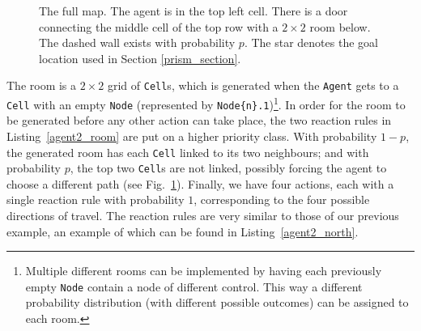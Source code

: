 \documentclass[runningheads]{llncs}
\begin{document}
\begin{figure}
  \centering
  \caption{The full map. The agent is in the top left cell. There is a door
    connecting the middle cell of the top row with a $2 \times 2$ room below.
    The dashed wall exists with probability $p$. The star denotes the goal
    location used in Section \ref{prism_section}.}
  \label{agent2_map}
\end{figure}





The room is a $2 \times 2$ grid of \texttt{Cell}s, which is generated when the
\texttt{Agent} gets to a \texttt{Cell} with an empty \texttt{Node} (represented
by \texttt{Node\{n\}.1})\footnote{Multiple different rooms can be implemented by
having each previously empty \texttt{Node} contain a node of different control.
This way a different probability distribution (with different possible outcomes)
can be assigned to each room.}. In order for the room to be generated before any
other action can take place, the two reaction rules in Listing~\ref{agent2_room}
are put on a higher priority class. With probability $1-p$, the generated room
has each \texttt{Cell} linked to its two neighbours; and with probability $p$,
the top two \texttt{Cell}s are not linked, possibly forcing the agent to choose
a different path (see Fig.~\ref{agent2_map}). Finally, we have four actions,
each with a single reaction rule with probability $1$, corresponding to the four
possible directions of travel. The reaction rules are very similar to those of
our previous example, an example of which can be found in
Listing~\ref{agent2_north}.
\end{document}
